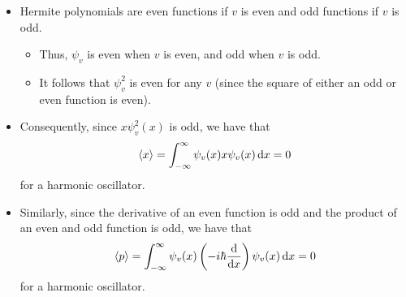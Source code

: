 \documentclass[../notes.tex]{subfiles}
\begin{document}
\begin{itemize}
    \item Hermite polynomials are even functions if $v$ is even and odd functions if $v$ is odd.
    \begin{itemize}
        \item Thus, $\psi_v$ is even when $v$ is even, and odd when $v$ is odd.
        \item It follows that $\psi_v^2$ is even for any $v$ (since the square of either an odd or even function is even).
    \end{itemize}
    \item Consequently, since $x\psi_v^2(x)$ is odd, we have that
    \begin{equation*}
        \langle{x}\rangle = \int_{-\infty}^\infty\psi_v(x)x\psi_v(x)\dd{x} = 0
    \end{equation*}
    for a harmonic oscillator.
    \item Similarly, since the derivative of an even function is odd and the product of an even and odd function is odd, we have that
    \begin{equation*}
        \langle{p}\rangle = \int_{-\infty}^\infty\psi_v(x)\left( -i\hbar\dv{x} \right)\psi_v(x)\dd{x} = 0
    \end{equation*}
    for a harmonic oscillator.
\end{itemize}
\end{document}

